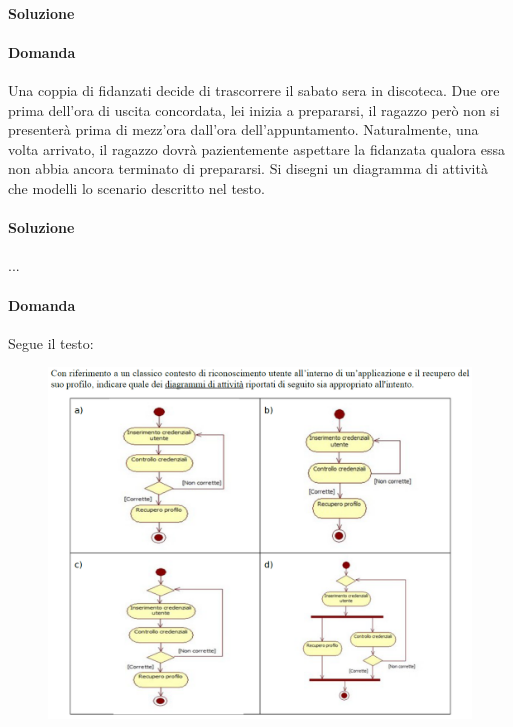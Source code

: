 \paragraph{Soluzione}

\paragraph{Domanda} 

Una coppia di fidanzati decide di trascorrere il sabato sera in discoteca. Due ore prima dell'ora di uscita concordata, lei
inizia a prepararsi, il ragazzo però non si presenterà prima di mezz'ora dall'ora dell'appuntamento. Naturalmente, una
volta arrivato, il ragazzo dovrà pazientemente aspettare la fidanzata qualora essa non abbia ancora terminato di prepararsi.
Si disegni un diagramma di attività che modelli lo scenario descritto nel testo.

\paragraph{Soluzione} ...

\paragraph{Domanda} Segue il testo:

\begin{figure}[H]\center
\includegraphics[width=1\textwidth]{res/img/Esercizi/es-diagrammaAttivita}
\end{figure}

